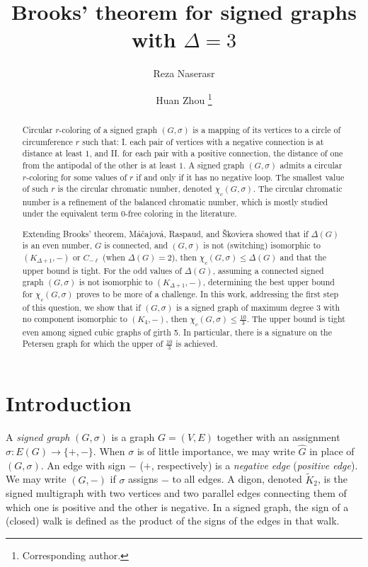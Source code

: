 \documentclass[11pt,a4paper]{article}
\title{Brooks' theorem for signed graphs with $\Delta=3$}
\author[1,2]{Reza Naserasr}
\author[1,2]{Huan Zhou \thanks{Corresponding author.}}
\affil[1]{\small Universit\'e Paris Cit\'e, CNRS, IRIF, F-75013, Paris, France. {Emails: \texttt{\{reza, zhou\}@irif.fr}}}
\affil[2]{\small Zhejiang Normal University, Jinhua, China. {Email: \texttt{huanzhou@zjnu.edu.cn}}}
\theoremstyle{definition}
\begin{document}
	\maketitle
	
	
	\begin{abstract}
Circular $r$-coloring of a signed graph $(G,\sigma)$ is a mapping of its vertices to a circle of circumference $r$ such that: I. each pair of vertices with a negative connection is at distance at least $1$, and II. for each pair with a positive connection, the distance of one from the antipodal of the other is at least $1$. A signed graph $(G,\sigma)$ admits a circular $r$-coloring for some values of $r$ if and only if it has no negative loop. The smallest value of such $r$ is the circular chromatic number, denoted  $\chi_{c}(G,\sigma)$.
The circular chromatic number is a refinement of the balanced chromatic number, which is mostly studied under the equivalent term $0$-free coloring in the literature. 

Extending Brooks' theorem,  M\'a\v cajov\'a,  Raspaud, and \v{S}koviera showed that if $\Delta(G)$ is an even number, $G$ is connected, and $(G,\sigma)$ is not (switching) isomorphic to $(K_{\Delta+1},-)$ or $C_{-\ell}$ (when $\Delta(G)=2$), then $\chi_c(G,\sigma)\leq \Delta(G)$ and that the upper bound is tight. For the odd values of $\Delta(G)$, assuming a connected signed graph $(G,\sigma)$ is not  isomorphic to $(K_{\Delta+1},-)$, determining the best upper bound for $\chi_c(G, \sigma)$  proves to be more of a challenge. In this work, addressing the first step of this question, we show that if $(G, \sigma)$ is a signed graph of maximum degree 3 with no  component  isomorphic to $(K_4, -)$, then $\chi_{c}(G, \sigma)\leq \frac{10}{3}$. The upper bound is tight even among signed cubic graphs of girth 5. In particular, there is a signature on the Petersen graph for which the upper of $\frac{10}{3}$ is achieved. 
	\end{abstract}
	\section{Introduction}
	
	A \emph{signed graph}  $(G,\sigma)$ is a graph $G=(V,E)$ together with an assignment $\sigma:E(G)\rightarrow \{+,-\}$. When $\sigma$ is of little importance, we may write $\widehat{G}$ in place of $(G,\sigma)$. An edge with sign $-$ ($+$, respectively) is a \emph{negative edge} (\emph{positive edge}). We may write $(G,-)$ if $\sigma$ assigns $-$ to all edges. A digon, denoted $\widetilde{K}_2$, is the signed multigraph with two vertices and two parallel edges connecting them of which one is positive and the other is negative. In a signed graph, the sign of a (closed) walk is defined as the product of the signs of the edges in that walk. 
	
\end{document}
